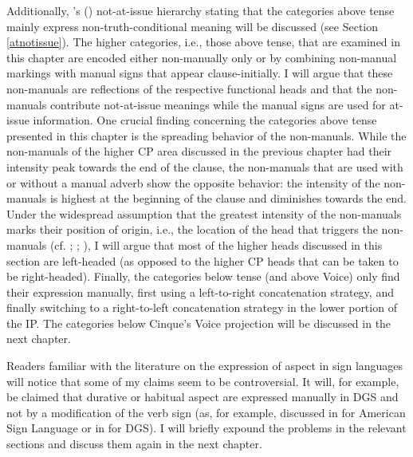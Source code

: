 Additionally, \citeauthor{bross2017scope}'s (\citeyear{bross2017scope}) not-at-issue hierarchy stating that the categories above tense mainly express non-truth-conditional meaning will be discussed (see Section \ref{atnotissue}). The higher categories, i.e., those above tense, that are examined in this chapter are encoded either non-manually only or by combining non-manual markings with manual signs that appear clause-initially. I will argue that these non-manuals are reflections of the respective functional heads and that the non-manuals contribute not-at-issue meanings while the manual signs are used for at-issue information. One crucial finding concerning the categories above tense presented in this chapter is the spreading behavior of the non-manuals. While the non-manuals of the higher CP area discussed in the previous chapter had their intensity peak towards the end of the clause, the non-manuals that are used with or without a manual adverb show the opposite behavior: the intensity of the non-manuals is highest at the beginning of the clause and diminishes towards the end. Under the widespread assumption that the greatest intensity of the non-manuals marks their position of origin, i.e., the location of the head that triggers the non-manuals (cf. \citealt{bahan1996, petronio1997}; \citealt[43--45]{neidle2000syntax}; \citealt[311--312]{sandler2006sign}), I will argue that most of the higher heads discussed in this section are left-headed (as opposed to the higher CP heads that can be taken to be right-headed). Finally, the categories below tense (and above Voice) only find their expression manually, first using a left-to-right concatenation strategy, and finally switching to a right-to-left concatenation strategy in the lower portion of the IP. The categories below Cinque's Voice projection will be discussed in the next chapter. %

Readers familiar with the literature on the expression of aspect in sign languages will notice that some of my claims seem to be controversial. It will, for example, be claimed that durative or habitual aspect are expressed manually in DGS and not by a modification of the verb sign (as, for example, discussed in \citealt{rathmann2005event} for American Sign Language or in \citealt{happ2014vork}  for DGS). I will briefly expound the problems in the relevant sections and discuss them again in the next chapter. 

